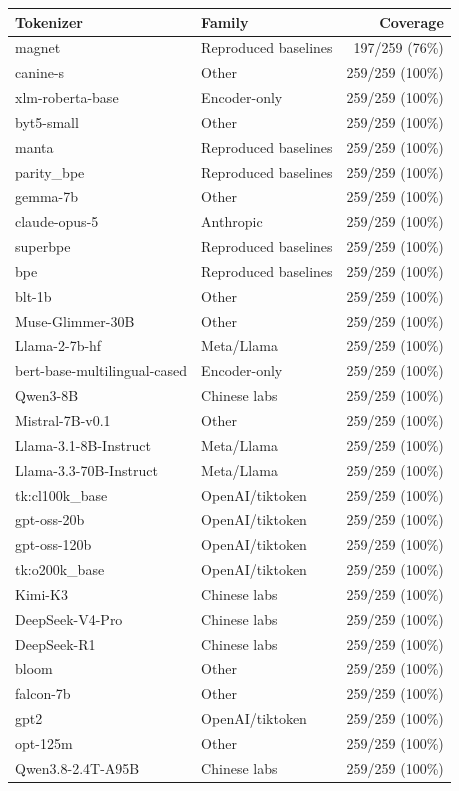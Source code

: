 \documentclass{standalone}
\begin{document}
\begin{tabular}{llr}
\toprule
Tokenizer & Family & Coverage \\
\midrule
magnet & Reproduced baselines & 197/259 (76\%) \\
canine-s & Other & 259/259 (100\%) \\
xlm-roberta-base & Encoder-only & 259/259 (100\%) \\
byt5-small & Other & 259/259 (100\%) \\
manta & Reproduced baselines & 259/259 (100\%) \\
parity\_bpe & Reproduced baselines & 259/259 (100\%) \\
gemma-7b & Other & 259/259 (100\%) \\
claude-opus-5 & Anthropic & 259/259 (100\%) \\
superbpe & Reproduced baselines & 259/259 (100\%) \\
bpe & Reproduced baselines & 259/259 (100\%) \\
blt-1b & Other & 259/259 (100\%) \\
Muse-Glimmer-30B & Other & 259/259 (100\%) \\
Llama-2-7b-hf & Meta/Llama & 259/259 (100\%) \\
bert-base-multilingual-cased & Encoder-only & 259/259 (100\%) \\
Qwen3-8B & Chinese labs & 259/259 (100\%) \\
Mistral-7B-v0.1 & Other & 259/259 (100\%) \\
Llama-3.1-8B-Instruct & Meta/Llama & 259/259 (100\%) \\
Llama-3.3-70B-Instruct & Meta/Llama & 259/259 (100\%) \\
tk:cl100k\_base & OpenAI/tiktoken & 259/259 (100\%) \\
gpt-oss-20b & OpenAI/tiktoken & 259/259 (100\%) \\
gpt-oss-120b & OpenAI/tiktoken & 259/259 (100\%) \\
tk:o200k\_base & OpenAI/tiktoken & 259/259 (100\%) \\
Kimi-K3 & Chinese labs & 259/259 (100\%) \\
DeepSeek-V4-Pro & Chinese labs & 259/259 (100\%) \\
DeepSeek-R1 & Chinese labs & 259/259 (100\%) \\
bloom & Other & 259/259 (100\%) \\
falcon-7b & Other & 259/259 (100\%) \\
gpt2 & OpenAI/tiktoken & 259/259 (100\%) \\
opt-125m & Other & 259/259 (100\%) \\
Qwen3.8-2.4T-A95B & Chinese labs & 259/259 (100\%) \\
\bottomrule
\end{tabular}
\end{document}
